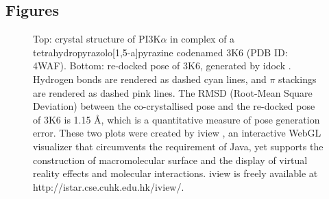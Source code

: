 \documentclass[twocolumn]{bmcart}
\begin{document}
\begin{backmatter}

\section*{Figures}

\begin{figure}[h]
\caption{ Top: crystal structure of PI3K$\alpha$ in complex of a tetrahydropyrazolo[1,5-a]pyrazine codenamed 3K6 (PDB ID: 4WAF). Bottom: re-docked pose of 3K6, generated by idock \cite{1362}. Hydrogen bonds are rendered as dashed cyan lines, and $\pi$ stackings are rendered as dashed pink lines. The RMSD (Root-Mean Square Deviation) between the co-crystallised pose and the re-docked pose of 3K6 is 1.15 \AA, which is a quantitative measure of pose generation error. These two plots were created by iview \cite{1366}, an interactive WebGL visualizer that circumvents the requirement of Java, yet supports the construction of macromolecular surface and the display of virtual reality effects and molecular interactions. iview is freely available at http://istar.cse.cuhk.edu.hk/iview/.
}
\label{fig:4WAF}
\end{figure}

\begin{figure}
\centering
\caption{}
\label{rfscore4:set-1-pdbbind-2007}
\end{figure}

\begin{figure}[h]
\caption{}
\label{rfscore4:set-2-pdbbind-2012}
\end{figure}



\end{backmatter}
\end{document}
